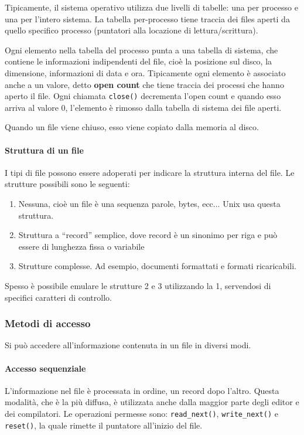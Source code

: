 \documentclass[a4paper]{article}
\begin{document}
Tipicamente, il sistema operativo utilizza due livelli di tabelle: una per processo e una per l'intero sistema. La tabella per-processo tiene traccia dei files aperti da quello specifico processo (puntatori alla locazione di lettura/scrittura).

Ogni elemento nella tabella del processo punta a una tabella di sistema, che contiene le informazioni indipendenti del file, cioè la posizione sul disco, la dimensione, informazioni di data e ora. Tipicamente ogni elemento è associato anche a un valore, detto \textbf{open count} che tiene traccia dei processi che hanno aperto il file. Ogni chiamata \texttt{close()} decrementa l'open count e quando esso arriva al valore 0, l'elemento è rimosso dalla tabella di sistema dei file aperti.

Quando un file viene chiuso, esso viene copiato dalla memoria al disco.

\paragraph{Struttura di un file}
I tipi di file possono essere adoperati per indicare la struttura interna del file. Le strutture possibili sono le seguenti:
\begin{enumerate}
   \item Nessuna, cioè un file è una sequenza parole, bytes, ecc... Unix usa questa struttura.
   \item Struttura a ``record'' semplice, dove record è un sinonimo per riga e può essere di lunghezza fissa o variabile
   \item Strutture complesse. Ad esempio, documenti formattati e formati ricaricabili.
\end{enumerate}
Spesso è possibile emulare le strutture 2 e 3 utilizzando la 1, servendosi di specifici caratteri di controllo.

\subsubsection{Metodi di accesso}
Si può accedere all'informazione contenuta in un file in diversi modi.
\paragraph{Accesso sequenziale}
L'informazione nel file è processata in ordine, un record dopo l'altro. Questa modalità, che è la più diffusa, è utilizzata anche dalla maggior parte degli editor e dei compilatori. Le operazioni permesse sono: \texttt{read\_next()}, \texttt{write\_next()} e \texttt{reset()}, la quale rimette il puntatore all'inizio del file.
\end{document}
